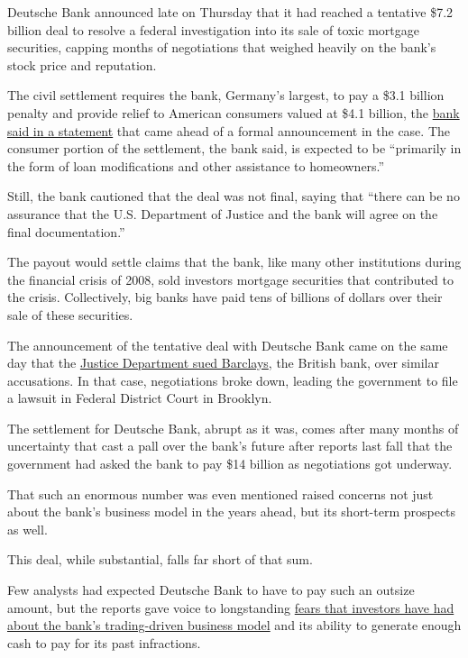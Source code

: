 Deutsche Bank announced late on Thursday that it had reached a tentative
\$7.2 billion deal to resolve a federal investigation into its sale of
toxic mortgage securities, capping months of negotiations that weighed
heavily on the bank's stock price and reputation.

The civil settlement requires the bank, Germany's largest, to pay a
\$3.1 billion penalty and provide relief to American consumers valued at
\$4.1 billion, the
\href{https://www.db.com/newsroom_news/2016/ghp/deutsche-bank-agrees-on-settlement-in-principle-with-the-doj-regarding-rmbs-en-11789.htm}{bank
said in a statement} that came ahead of a formal announcement in the
case. The consumer portion of the settlement, the bank said, is expected
to be ``primarily in the form of loan modifications and other assistance
to homeowners.''

Still, the bank cautioned that the deal was not final, saying that
``there can be no assurance that the U.S. Department of Justice and the
bank will agree on the final documentation.''

The payout would settle claims that the bank, like many other
institutions during the financial crisis of 2008, sold investors
mortgage securities that contributed to the crisis. Collectively, big
banks have paid tens of billions of dollars over their sale of these
securities.

The announcement of the tentative deal with Deutsche Bank came on the
same day that the
\href{https://www.nytimes.com/2016/12/22/business/dealbook/justice-department-sues-barclays-mortgage-backed-securities.html?ref=business}{Justice
Department sued Barclays}, the British bank, over similar accusations.
In that case, negotiations broke down, leading the government to file a
lawsuit in Federal District Court in Brooklyn.

The settlement for Deutsche Bank, abrupt as it was, comes after many
months of uncertainty that cast a pall over the bank's future after
reports last fall that the government had asked the bank to pay \$14
billion as negotiations got underway.

That such an enormous number was even mentioned raised concerns not just
about the bank's business model in the years ahead, but its short-term
prospects as well.

This deal, while substantial, falls far short of that sum.

Few analysts had expected Deutsche Bank to have to pay such an outsize
amount, but the reports gave voice to longstanding
\href{https://www.nytimes.com/2016/10/03/business/dealbook/deutsche-banks-appetite-for-risk-throws-off-its-balance.html}{fears
that investors have had about the bank's trading-driven business model}
and its ability to generate enough cash to pay for its past infractions.

